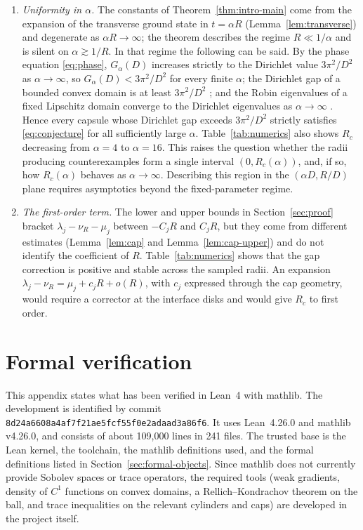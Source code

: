 \documentclass[11pt,a4paper]{article}
\numberwithin{equation}{section}
\theoremstyle{paperplain}
\theoremstyle{remark}
\newcommand{\leancommit}{\texttt{8d24a660\allowbreak 8a4af7f2\allowbreak 1ae5fcf5\allowbreak 5f0e2ada\allowbreak ad3a86f6}}
\newcommand{\leanversion}{Lean~4.26.0}
\newcommand{\mathlibversion}{mathlib v4.26.0}
\newcommand{\leanfiles}{241}
\newcommand{\leanlines}{109{,}000}
\begin{document}
\begin{enumerate}[label=(\arabic*)]
The sharp cap inequality does not: the calibration
$X=(\sqrt{1-|z|^2},z)$ of Section~\ref{sec:calibration} is a unit field
precisely because the cross-section is a ball, and for other $Q$ the
minimizing cap and the minimal coefficient are unknown.
\item \emph{Uniformity in $\alpha$.} The constants of
Theorem~\ref{thm:intro-main} come from the expansion of the transverse
ground state in $t=\alpha R$ (Lemma~\ref{lem:transverse}) and degenerate as
$\alpha R\to\infty$; the theorem describes the regime $R\ll1/\alpha$ and is
silent on $\alpha\gtrsim1/R$. In that regime the following can be said.
By the phase equation \eqref{eq:phase}, $G_\alpha(D)$ increases strictly to
the Dirichlet value $3\pi^2/D^2$ as $\alpha\to\infty$, so
$G_\alpha(D)<3\pi^2/D^2$ for every finite $\alpha$; the Dirichlet gap of a
bounded convex domain is at least $3\pi^2/D^2$ \cite{AC}; and the Robin
eigenvalues of a fixed Lipschitz domain converge to the Dirichlet
eigenvalues as $\alpha\to\infty$ \cite{BFK}. Hence every capsule whose
Dirichlet gap exceeds $3\pi^2/D^2$ strictly satisfies \eqref{eq:conjecture}
for all sufficiently large $\alpha$. Table~\ref{tab:numerics} also shows
$R_c$ decreasing from $\alpha=4$ to $\alpha=16$. This raises the question
whether the radii producing counterexamples form a single interval
$(0,R_c(\alpha))$, and, if so, how $R_c(\alpha)$ behaves as
$\alpha\to\infty$. Describing this region in the $(\alpha D,R/D)$ plane
requires asymptotics beyond the fixed-parameter regime.
\item \emph{The first-order term.} The lower and upper bounds in
Section~\ref{sec:proof} bracket $\lambda_j-\nu_R-\mu_j$ between $-C_jR$ and
$C_jR$, but they come from different estimates (Lemma~\ref{lem:cap} and
Lemma~\ref{lem:cap-upper}) and do not identify the coefficient of $R$.
Table~\ref{tab:numerics} shows that the gap correction is positive and
stable across the sampled radii. An expansion
$\lambda_j-\nu_R=\mu_j+c_jR+o(R)$, with $c_j$ expressed through the cap
geometry, would require a corrector at the interface disks and would give
$R_c$ to first order.
\end{enumerate}

\appendix
\section{Formal verification}\label{sec:formal}

This appendix states what has been verified in Lean~4 with mathlib. The development is identified by commit \leancommit. It uses \leanversion{} and
\mathlibversion{}, and consists of about \leanlines{} lines in \leanfiles{}
files. The trusted base is the Lean kernel, the toolchain, the mathlib
definitions used, and the formal definitions listed in
Section~\ref{sec:formal-objects}. Since mathlib does not currently provide Sobolev spaces or trace
operators, the required tools (weak gradients, density of $C^1$ functions on
convex domains, a Rellich--Kondrachov theorem on the ball, and trace
inequalities on the relevant cylinders and caps) are developed in the project
itself.
\end{document}
